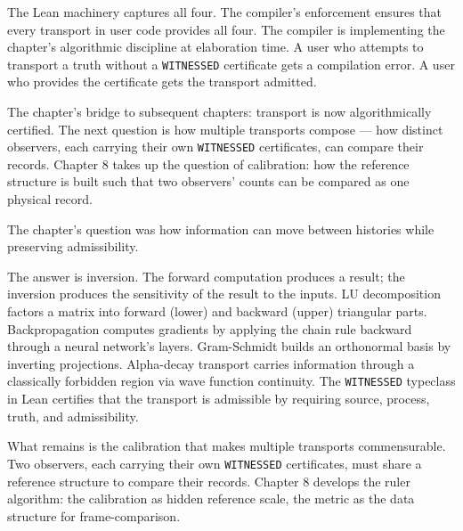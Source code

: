 The Lean machinery captures all four. The compiler's enforcement
ensures that every transport in user code provides all four. The
compiler is implementing the chapter's algorithmic discipline at
elaboration time. A user who attempts to transport a truth
without a \texttt{WITNESSED} certificate gets a compilation
error. A user who provides the certificate gets the transport
admitted.

The chapter's bridge to subsequent chapters: transport is now
algorithmically certified. The next question is how multiple
transports compose --- how distinct observers, each carrying their
own \texttt{WITNESSED} certificates, can compare their records.
Chapter 8 takes up the question of calibration: how the
reference structure is built such that two observers' counts can
be compared as one physical record.

\begin{bridge}

The chapter's question was how information can move between histories
while preserving admissibility.

The answer is inversion. The forward computation produces a result;
the inversion produces the sensitivity of the result to the inputs.
LU decomposition factors a matrix into forward (lower) and backward
(upper) triangular parts. Backpropagation computes gradients by
applying the chain rule backward through a neural network's layers.
Gram-Schmidt builds an orthonormal basis by inverting projections.
Alpha-decay transport carries information through a classically
forbidden region via wave function continuity. The
\texttt{WITNESSED} typeclass in Lean certifies that the transport
is admissible by requiring source, process, truth, and
admissibility.

What remains is the calibration that makes multiple transports
commensurable. Two observers, each carrying their own
\texttt{WITNESSED} certificates, must share a reference structure to
compare their records. Chapter 8 develops the ruler algorithm: the
calibration as hidden reference scale, the metric as the data
structure for frame-comparison.

\end{bridge}

